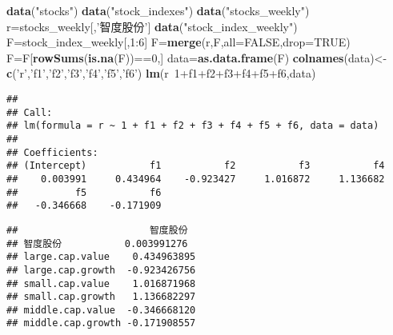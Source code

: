 \documentclass[]{ctexart}
\newenvironment{Shaded}{\begin{snugshade}}{\end{snugshade}}
\newcommand{\KeywordTok}[1]{\textcolor[rgb]{0.13,0.29,0.53}{\textbf{{#1}}}}
\newcommand{\DataTypeTok}[1]{\textcolor[rgb]{0.13,0.29,0.53}{{#1}}}
\newcommand{\DecValTok}[1]{\textcolor[rgb]{0.00,0.00,0.81}{{#1}}}
\newcommand{\StringTok}[1]{\textcolor[rgb]{0.31,0.60,0.02}{{#1}}}
\newcommand{\OtherTok}[1]{\textcolor[rgb]{0.56,0.35,0.01}{{#1}}}
\newcommand{\NormalTok}[1]{{#1}}
\begin{document}
\begin{Shaded}
\begin{Highlighting}[]
\KeywordTok{data}\NormalTok{(}\StringTok{"stocks"}\NormalTok{)}
\KeywordTok{data}\NormalTok{(}\StringTok{"stock_indexes"}\NormalTok{)}
\KeywordTok{data}\NormalTok{(}\StringTok{"stocks_weekly"}\NormalTok{)}
\NormalTok{r=stocks_weekly[,}\StringTok{'智度股份'}\NormalTok{]}
\KeywordTok{data}\NormalTok{(}\StringTok{"stock_index_weekly"}\NormalTok{)}
\NormalTok{F=stock_index_weekly[,}\DecValTok{1}\NormalTok{:}\DecValTok{6}\NormalTok{]}
\NormalTok{F=}\KeywordTok{merge}\NormalTok{(r,F,}\DataTypeTok{all=}\OtherTok{FALSE}\NormalTok{,}\DataTypeTok{drop=}\OtherTok{TRUE}\NormalTok{)}
\NormalTok{F=F[}\KeywordTok{rowSums}\NormalTok{(}\KeywordTok{is.na}\NormalTok{(F))==}\DecValTok{0}\NormalTok{,]}
\NormalTok{data=}\KeywordTok{as.data.frame}\NormalTok{(F)}
\KeywordTok{colnames}\NormalTok{(data)<-}\KeywordTok{c}\NormalTok{(}\StringTok{'r'}\NormalTok{,}\StringTok{'f1'}\NormalTok{,}\StringTok{'f2'}\NormalTok{,}\StringTok{'f3'}\NormalTok{,}\StringTok{'f4'}\NormalTok{,}\StringTok{'f5'}\NormalTok{,}\StringTok{'f6'}\NormalTok{)}
\KeywordTok{lm}\NormalTok{(r~}\DecValTok{1}\NormalTok{+f1+f2+f3+f4+f5+f6,data)}
\end{Highlighting}
\end{Shaded}

\begin{verbatim}
## 
## Call:
## lm(formula = r ~ 1 + f1 + f2 + f3 + f4 + f5 + f6, data = data)
## 
## Coefficients:
## (Intercept)           f1           f2           f3           f4  
##    0.003991     0.434964    -0.923427     1.016872     1.136682  
##          f5           f6  
##   -0.346668    -0.171909
\end{verbatim}

\begin{Shaded}
\end{Shaded}

\begin{verbatim}
##                       智度股份
## 智度股份           0.003991276
## large.cap.value    0.434963895
## large.cap.growth  -0.923426756
## small.cap.value    1.016871968
## small.cap.growth   1.136682297
## middle.cap.value  -0.346668120
## middle.cap.growth -0.171908557
\end{verbatim}
\end{document}
